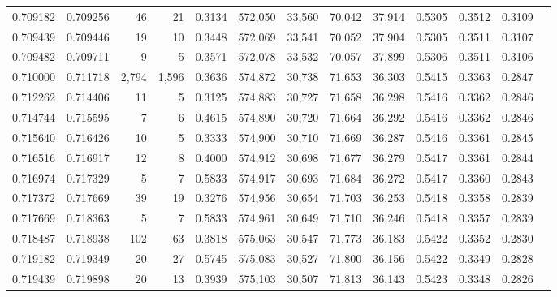 \begin{tabular}{rrrrrrrrrrrrr}
0.709182 & 0.709256 &     46 &    21 &                                     0.3134 & 572,050 &  33,560 &  70,042 &  37,914 & 0.5305 & 0.3512 & 0.3109 \\
0.709439 & 0.709446 &     19 &    10 &                                     0.3448 & 572,069 &  33,541 &  70,052 &  37,904 & 0.5305 & 0.3511 & 0.3107 \\
0.709482 & 0.709711 &      9 &     5 &                                     0.3571 & 572,078 &  33,532 &  70,057 &  37,899 & 0.5306 & 0.3511 & 0.3106 \\
0.710000 & 0.711718 &  2,794 & 1,596 &                                     0.3636 & 574,872 &  30,738 &  71,653 &  36,303 & 0.5415 & 0.3363 & 0.2847 \\
0.712262 & 0.714406 &     11 &     5 &                                     0.3125 & 574,883 &  30,727 &  71,658 &  36,298 & 0.5416 & 0.3362 & 0.2846 \\
0.714744 & 0.715595 &      7 &     6 &                                     0.4615 & 574,890 &  30,720 &  71,664 &  36,292 & 0.5416 & 0.3362 & 0.2846 \\
0.715640 & 0.716426 &     10 &     5 &                                     0.3333 & 574,900 &  30,710 &  71,669 &  36,287 & 0.5416 & 0.3361 & 0.2845 \\
0.716516 & 0.716917 &     12 &     8 &                                     0.4000 & 574,912 &  30,698 &  71,677 &  36,279 & 0.5417 & 0.3361 & 0.2844 \\
0.716974 & 0.717329 &      5 &     7 &                                     0.5833 & 574,917 &  30,693 &  71,684 &  36,272 & 0.5417 & 0.3360 & 0.2843 \\
0.717372 & 0.717669 &     39 &    19 &                                     0.3276 & 574,956 &  30,654 &  71,703 &  36,253 & 0.5418 & 0.3358 & 0.2839 \\
0.717669 & 0.718363 &      5 &     7 &                                     0.5833 & 574,961 &  30,649 &  71,710 &  36,246 & 0.5418 & 0.3357 & 0.2839 \\
0.718487 & 0.718938 &    102 &    63 &                                     0.3818 & 575,063 &  30,547 &  71,773 &  36,183 & 0.5422 & 0.3352 & 0.2830 \\
0.719182 & 0.719349 &     20 &    27 &                                     0.5745 & 575,083 &  30,527 &  71,800 &  36,156 & 0.5422 & 0.3349 & 0.2828 \\
0.719439 & 0.719898 &     20 &    13 &                                     0.3939 & 575,103 &  30,507 &  71,813 &  36,143 & 0.5423 & 0.3348 & 0.2826 \\

\end{tabular}
